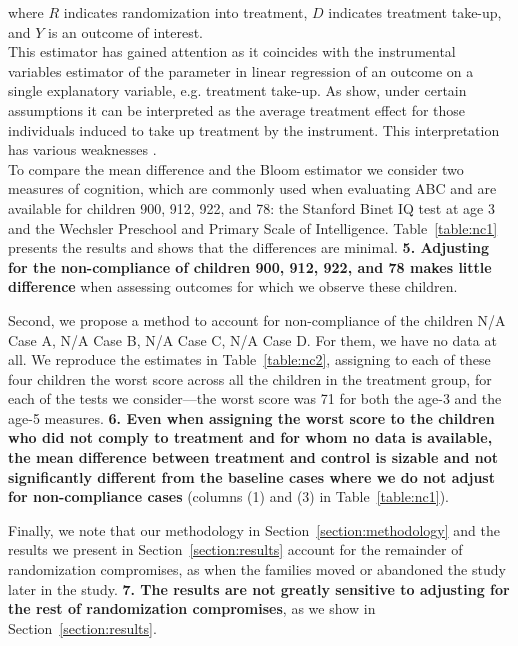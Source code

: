 \begin{appendices}
\noindent where $R$ indicates randomization into treatment, $D$ indicates treatment take-up, and $Y$ is an outcome of interest.\\

\noindent This estimator has gained attention as it coincides with the instrumental variables estimator of the parameter in linear regression of an outcome on a single explanatory variable, e.g. treatment take-up. As \citet{Angrist_Imbens_ea_1996_JASA} show, under certain assumptions it can be interpreted as the average treatment effect for those individuals induced to take up treatment by the instrument. This interpretation has various weaknesses \citep{Heckman_Urzua_2010_JoE,Heckman_Urzua_etal_2006_REStat}.\\

\noindent To compare the mean difference and the Bloom estimator we consider two measures of cognition, which are commonly used when evaluating ABC and are available for children 900, 912, 922, and 78: the Stanford Binet IQ test at age 3 and the Wechsler Preschool and Primary Scale of Intelligence. Table~\ref{table:nc1} presents the results and shows that the differences are minimal. \textbf{5. Adjusting for the non-compliance of children 900, 912, 922, and 78 makes little difference} when assessing outcomes for which we observe these children. 



\noindent Second, we propose a method to account for non-compliance of the children N/A Case A, N/A Case B, N/A Case C, N/A Case D. For them, we have no data at all. We reproduce the estimates in Table~\ref{table:nc2}, assigning to each of these four children the worst score across all the children in the treatment group, for each of the tests we consider---the worst score was 71 for both the age-3 and the age-5 measures. \textbf{6. Even when assigning the worst score to the children who did not comply to treatment and for whom no data is available, the mean difference between treatment and control is sizable and not significantly different from the baseline cases where we do not adjust for non-compliance cases} (columns (1) and (3) in Table~\ref{table:nc1}).



\noindent Finally, we note that our methodology in Section~\ref{section:methodology} and the results we present in Section~\ref{section:results} account for the remainder of randomization compromises, as when the families moved or abandoned the study later in the study. \textbf{7. The results are not greatly sensitive to adjusting for the rest of randomization compromises}, as we show in Section~\ref{section:results}.

\end{appendices}

\renewcommand{\refname}{Appendix References}
\clearpage
\singlespace



 